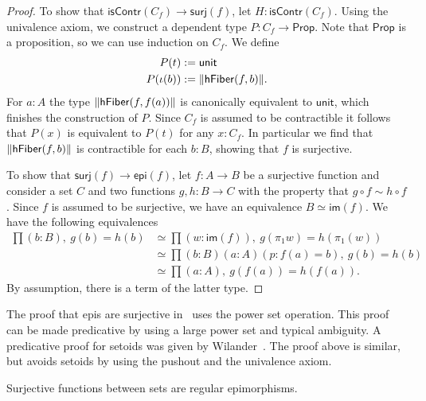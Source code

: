 \begin{proof}
To show that $\mathsf{isContr}(C_f)\to\mathsf{surj}(f)$,
let $H:\mathsf{isContr}(C_f)$. Using the univalence axiom, we construct
a dependent type $P:C_f\to\mathsf{Prop}$. Note that $\mathsf{Prop}$ is
a proposition, so we can use induction on $C_f$. We define
\begin{align*}
P(t) & := \mathsf{unit}\\
P(\iota(b)) & := \|\mathsf{hFiber}(f,b)\|.
\end{align*}
For $a:A$ the type $\|\mathsf{hFiber}(f,f(a))\|$ is canonically
equivalent to $\mathsf{unit}$, which finishes the construction of $P$.
Since $C_f$ is assumed to be contractible it follows that $P(x)$ is
equivalent to $P(t)$ for any $x:C_f$. In particular we find that
$\|\mathsf{hFiber}(f,b)\|$ is contractible for each $b:B$, showing
that $f$ is surjective.

To show that $\mathsf{surj}(f)\to\mathsf{epi}(f)$,
let $f:A\to B$ be a surjective function and consider a set $C$ and two functions
$g,h:B\to C$ with the property that $g\circ f\sim h\circ f$. Since $f$ 
is assumed to be surjective,
we have an equivalence $B\simeq\mathsf{im}(f)$. We have the following equivalences
\begin{align*}
\prod(b:B),\ g(b)= h(b) 
& \simeq \prod(w:\mathsf{im}(f)),\ g(\pi_1 w)= h(\pi_1(w))\\
& \simeq \prod(b:B)(a:A)(p:f(a)= b),\ g(b)= h(b)\\
& \simeq \prod(a:A),\ g(f(a))= h(f(a)).
\end{align*}
By assumption, there is a term of the latter type.
\end{proof}
The proof that epis are surjective in~\cite{Mines/R/R:1988} uses the power set operation. 
This proof can be made predicative by using a large power set and typical ambiguity.
A predicative proof for setoids was given by Wilander~\cite{Wilander2010}. 
The proof above is similar, but avoids setoids by using the pushout and the
univalence axiom. 

\begin{lem}\label{lem:images_are_coequalizers}
Surjective functions between sets are regular epimorphisms.
\end{lem}

